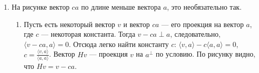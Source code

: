 \begin{enumerate}
\item
{}

На рисунке вектор $ca$ по длине меньше вектора $a$, это необязательно так.
\begin{enumerate}
	\item
	Пусть есть некоторый вектор $v$ и вектор $ca$ — его проекция на вектор $a$, где $c$ — некоторая константа. 
	Тогда $v - ca \perp a$, следовательно, $\langle v - ca, a \rangle = 0$. 
	Отсюда легко найти константу $c$: $\langle v,a \rangle - c \langle a, a \rangle = 0$, $c = \frac{\langle v,a \rangle}{\langle a,a \rangle}$. 
	Вектор $Hv$ — проекция $v$ на $a^{\perp}$ по условию. По рисунку видно, что $Hv = v - ca$.
	

\end{enumerate}
\end{enumerate}
